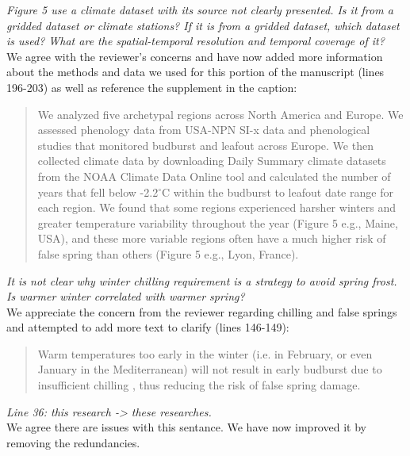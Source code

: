 \documentclass[11pt,a4paper]{article}
\begin{document}
\textit{Figure 5 use a climate dataset with its source not clearly presented. Is it from a gridded dataset or climate stations? If it is from a gridded dataset, which dataset is used? What are the spatial-temporal resolution and temporal coverage of it?} \\

We agree with the reviewer's concerns and have now added more information about the methods and data we used for this portion of the manuscript (lines 196-203) as well as reference the supplement in the caption: \\

\begin{quotation}
We analyzed five archetypal regions across North America and Europe. We assessed phenology data from USA-NPN SI-x data and phenological studies that monitored budburst and leafout across Europe. We then collected climate data by downloading Daily Summary climate datasets from the NOAA Climate Data Online tool \citep{NOAA} and calculated the number of years that fell below -2.2$^{\circ}$C within the budburst to leafout date range for each region. We found that some regions experienced harsher winters and greater temperature variability throughout the year (Figure 5 e.g., Maine, USA), and these more variable regions often have a much higher risk of false spring than others (Figure 5 e.g., Lyon, France).
\end{quotation} 

\textit{It is not clear why winter chilling requirement is a strategy to avoid spring frost. Is warmer winter correlated with warmer spring?} \\

We appreciate the concern from the reviewer regarding chilling and false springs and attempted to add more text to clarify (lines 146-149): \\

\begin{quotation}
Warm temperatures too early in the winter (i.e. in February, or even January in the Mediterranean) will not result in early budburst due to insufficient chilling \citep{Basler2012}, thus reducing the risk of false spring damage.
\end{quotation} 

\textit{Line 36: this research -> these researches.}\\

We agree there are issues with this sentance. We have now improved it by removing the redundancies. \\
\end{document}

